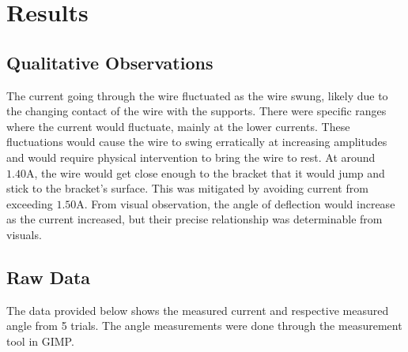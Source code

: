 \section*{Results}

\subsection*{Qualitative Observations}

The current going through the wire fluctuated as the wire swung, likely due to the changing contact of the wire with the supports.
There were specific ranges where the current would fluctuate, mainly at the lower currents.
These fluctuations would cause the wire to swing erratically at increasing amplitudes and would require physical intervention to bring the wire to rest.
At around $1.40\si{\ampere}$, the wire would get close enough to the bracket that it would jump and stick to the bracket's surface.
This was mitigated by avoiding current from exceeding $1.50\si{\ampere}$.
From visual observation, the angle of deflection would increase as the current increased, but their precise relationship was determinable
from visuals.

\subsection*{Raw Data}

The data provided below shows the measured current and respective measured angle from 5 trials.
The angle measurements were done through the measurement tool in GIMP.

